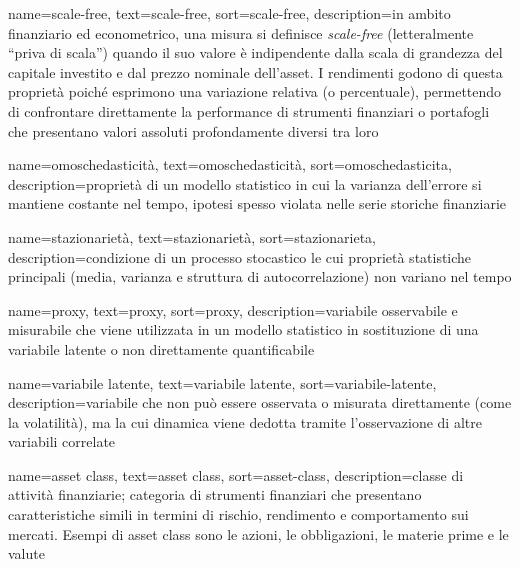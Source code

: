 
 {
    name=scale-free,
    text=scale-free,
    sort=scale-free,
    description={in ambito finanziario ed econometrico, una misura si definisce \emph{scale-free} (letteralmente \enquote{priva di scala}) quando il suo valore è indipendente dalla scala di grandezza del capitale investito e dal prezzo nominale dell'asset. I rendimenti godono di questa proprietà poiché esprimono una variazione relativa (o percentuale), permettendo di confrontare direttamente la performance di strumenti finanziari o portafogli che presentano valori assoluti profondamente diversi tra loro}
}

 {
    name=omoschedasticità,
    text=omoschedasticità,
    sort=omoschedasticita,
    description={proprietà di un modello statistico in cui la varianza dell'errore si mantiene costante nel tempo, ipotesi spesso violata nelle serie storiche finanziarie}
}

 {
    name=stazionarietà,
    text=stazionarietà,
    sort=stazionarieta,
    description={condizione di un processo stocastico le cui proprietà statistiche principali (media, varianza e struttura di autocorrelazione) non variano nel tempo}
}

 {
    name=proxy,
    text=proxy,
    sort=proxy,
    description={variabile osservabile e misurabile che viene utilizzata in un modello statistico in sostituzione di una variabile latente o non direttamente quantificabile}
}

 {
    name=variabile latente,
    text=variabile latente,
    sort=variabile-latente,
    description={variabile che non può essere osservata o misurata direttamente (come la volatilità), ma la cui dinamica viene dedotta tramite l'osservazione di altre variabili correlate}
}

 {
    name=asset class,
    text=asset class,
    sort=asset-class,
    description={classe di attività finanziarie; categoria di strumenti finanziari che presentano caratteristiche simili in termini di rischio, rendimento e comportamento sui mercati. Esempi di asset class sono le azioni, le obbligazioni, le materie prime e le valute}
}

